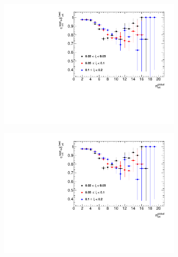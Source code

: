 \begin{figure}[h!]
\begin{subfigure}{.49\textwidth}
	\end{subfigure}
	\begin{subfigure}{.49\textwidth}
		\includegraphics[width=\textwidth,page=5]{chapters/chrgSTAR/img/vertex/vertexEffi_ksi.pdf}
	\end{subfigure}
	\begin{subfigure}{.49\textwidth}
		\includegraphics[width=\textwidth,page=6]{chapters/chrgSTAR/img/vertex/vertexEffi_ksi.pdf}
	\end{subfigure}
	\begin{subfigure}{.49\textwidth}

\end{subfigure}
\end{figure}
